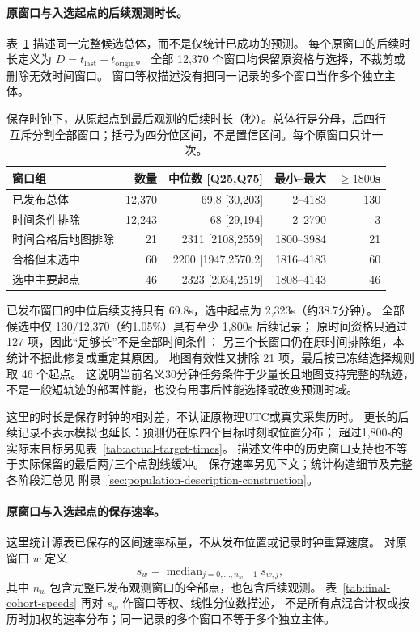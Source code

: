 \documentclass[UTF8,11pt]{ctexart}
\begin{document}
\paragraph{原窗口与入选起点的后续观测时长。}\label{sec:final-cohort-durations}
表~\ref{tab:final-cohort-durations} 描述同一完整候选总体，而不是仅统计已成功的预测。
每个原窗口的后续时长定义为 $D=t_{\mathrm{last}}-t_{\mathrm{origin}}$。
全部 12,370 个窗口均保留原资格与选择，不裁剪或删除无效时间窗口。
窗口等权描述没有把同一记录的多个窗口当作多个独立主体。

\begin{table}[htbp]
\centering\small
\caption{保存时钟下，从原起点到最后观测的后续时长（秒）。总体行是分母，后四行互斥分割全部窗口；括号为四分位区间，不是置信区间。每个原窗口只计一次。}
\label{tab:final-cohort-durations}
\begin{tabular}{@{}lrrrr@{}}
\toprule
窗口组 & 数量 & 中位数 [Q25,Q75] & 最小--最大 & $\geq1800$s\\
\midrule
已发布总体 & 12,370 & 69.8 [30,203] & 2--4183 & 130\\
时间条件排除 & 12,243 & 68 [29,194] & 2--2790 & 3\\
时间合格后地图排除 & 21 & 2311 [2108,2559] & 1800--3984 & 21\\
合格但未选中 & 60 & 2200 [1947,2570.2] & 1816--4183 & 60\\
选中主要起点 & 46 & 2323 [2034,2519] & 1808--4143 & 46\\
\bottomrule
\end{tabular}
\end{table}

已发布窗口的中位后续支持只有 69.8s，选中起点为 2,323s（约38.7分钟）。
全部候选中仅 130/12,370（约1.05\%）具有至少 1,800s 后续记录；
原时间资格只通过 127 项，因此“足够长”不是全部时间条件：
另三个长窗口仍在原时间排除组，本统计不据此修复或重定其原因。
地图有效性又排除 21 项，最后按已冻结选择规则取 46 个起点。
这说明当前名义30分钟任务条件于少量长且地图支持完整的轨迹，
不是一般短轨迹的部署性能，也没有用事后性能选择或改变预测时域。

这里的时长是保存时钟的相对差，不认证原物理UTC或真实采集历时。
更长的后续记录不表示模拟也延长：预测仍在原四个目标时刻取位置分布；
超过1,800s的实际末目标另见表~\ref{tab:actual-target-times}。
描述文件中的历史窗口支持也不等于实际保留的最后两/三个点割线缓冲。
保存速率另见下文；统计构造细节及完整各阶段汇总见
附录~\ref{sec:population-description-construction}。

\paragraph{原窗口与入选起点的保存速率。}\label{sec:final-cohort-speeds}
这里统计源表已保存的区间速率标量，不从发布位置或记录时钟重算速度。
对原窗口 $w$ 定义
\begin{equation}
 s_w=\operatorname{median}_{j=0,\ldots,n_w-1}s_{w,j},
 \label{eq:cohort-window-speed}
\end{equation}
其中 $n_w$ 包含完整已发布观测窗口的全部点，也包含后续观测。
表~\ref{tab:final-cohort-speeds} 再对 $s_w$ 作窗口等权、线性分位数描述，
不是所有点混合计权或按历时加权的速率分布；同一记录的多个窗口不等于多个独立主体。
\end{document}
